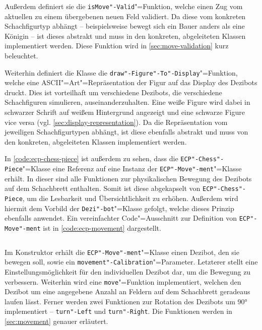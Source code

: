 \begin{listing}[h]
    \inputminted{cpp}{../assets/code/ECPChessPiece.cpp}
    \caption{Definition von \texttt{ECP"-Chess"-Piece} (vereinfacht)}
    \label{code:ecp-chess-piece}
\end{listing}


Außerdem definiert sie die \texttt{isMove"-Valid}"=Funktion, welche einen Zug vom aktuellen zu einem übergebenen neuen Feld validiert. Da diese vom konkreten Schachfigurtyp abhängt -- beispielsweise bewegt sich ein Bauer anders als eine Königin -- ist dieses abstrakt und muss in den konkreten, abgeleiteten Klassen implementiert werden. Diese Funktion wird in \autoref{sec:move-validation} kurz beleuchtet.

Weiterhin definiert die Klasse die \texttt{draw"-Figure"-To"-Display}"=Funktion, welche eine ASCII"=Art"=Repräsentation der Figur auf das Display des Dezibots druckt. Dies ist vorteilhaft um verschiedene Dezibots, die verschiedene Schachfiguren simulieren, auseinanderzuhalten. Eine weiße Figure wird dabei in schwarzer Schrift auf weißem Hintergrund angezeigt und eine schwarze Figure vice versa (vgl. \autoref{sec:display-representation}). Da die Repräsentation vom jeweiligen Schachfigurtypen abhängt, ist diese ebenfalls abstrakt und muss von den konkreten, abgeleiteten Klassen implementiert werden.


In \autoref{code:ecp-chess-piece} ist außerdem zu sehen, dass die \texttt{ECP"-Chess"-Piece}"=Klasse eine Referenz auf eine Instanz der \texttt{ECP"-Move"-ment}"=Klasse erhält. In dieser sind alle Funktionen zur physikalischen Bewegung des Dezibots auf dem Schachbrett enthalten. Somit ist diese abgekapselt von \texttt{ECP"-Chess"-Piece}, um die Lesbarkeit und Übersichtlichkeit zu erhöhen. Außerdem wird hiermit dem Vorbild der \texttt{Dezi"-bot}"=Klasse gefolgt, welche dieses Prinzip ebenfalls anwendet. Ein vereinfachter Code"=Ausschnitt zur Definition von \texttt{ECP"-Move"-ment} ist in \autoref{code:ecp-movement} dargestellt.

\begin{listing}[h]
    \inputminted{cpp}{../assets/code/ECPMovement.cpp}
    \caption{Vereinfachter Code"=Ausschnitt zur \texttt{ECP"-Move"-ment}"=Klasse}
    \label{code:ecp-movement}
\end{listing}

Im Konstruktor erhält die \texttt{ECP"-Move"-ment}"=Klasse einen Dezibot, den sie bewegen soll, sowie ein \texttt{movement"-Calibration}"=Parameter. Letzterer stellt eine Einstellungsmöglichkeit für den individuellen Dezibot dar, um die Bewegung zu verbessern. Weiterhin wird eine \texttt{move}"=Funktion implementiert, welchen den Dezibot um eine angegebene Anzahl an Feldern auf dem Schachbrett geradeaus laufen lässt. Ferner werden zwei Funktionen zur Rotation des Dezibots um 90° implementiert -- \texttt{turn"-Left} und \texttt{turn"-Right}. Die Funktionen werden in \autoref{sec:movement} genauer erläutert.

